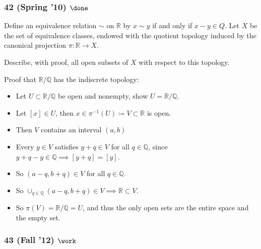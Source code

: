 \hypertarget{spring-10-done}{%
\subsubsection{\texorpdfstring{42 (Spring '10)
\(\done\)}{42 (Spring '10) \textbackslash done}}\label{spring-10-done}}

Define an equivalence relation \(\sim\) on \({\mathbb{R}}\) by
\(x \sim y\) if and only if \(x - y \in Q\). Let \(X\) be the set of
equivalence classes, endowed with the quotient topology induced by the
canonical projection \(\pi : {\mathbb{R}}\to X\).

Describe, with proof, all open subsets of \(X\) with respect to this
topology.

\begin{solution}

\hfill

\begin{concept}

\hfill

\end{concept}

Proof that \({\mathbb{R}}/{\mathbb{Q}}\) has the indiscrete topology:

\begin{itemize}
\tightlist
\item
  Let \(U \subset {\mathbb{R}}/{\mathbb{Q}}\) be open and nonempty, show
  \(U = {\mathbb{R}}/{\mathbb{Q}}\).
\item
  Let \([x] \in U\), then
  \(x \in \pi^{-1}(U) \coloneqq V \subset{\mathbb{R}}\) is open.
\item
  Then \(V\) contains an interval \((a, b)\)
\item
  Every \(y\in V\) satisfies \(y+q \in V\) for all
  \(q\in {\mathbb{Q}}\), since
  \(y+q-y \in {\mathbb{Q}}\implies [y+q] = [y]\).
\item
  So \((a-q, b+q) \in V\) for all \(q\in {\mathbb{Q}}\).
\item
  So
  \(\cup_{q\in {\mathbb{Q}}}(a-q, b+q) \in V \implies {\mathbb{R}}\subset V\).
\item
  So \(\pi(V) = {\mathbb{R}}/{\mathbb{Q}}= U\), and thus the only open
  sets are the entire space and the empty set.
\end{itemize}

\end{solution}

\hypertarget{fall-12-work}{%
\subsubsection{\texorpdfstring{43 (Fall '12)
\(\work\)}{43 (Fall '12) \textbackslash work}}\label{fall-12-work}}

